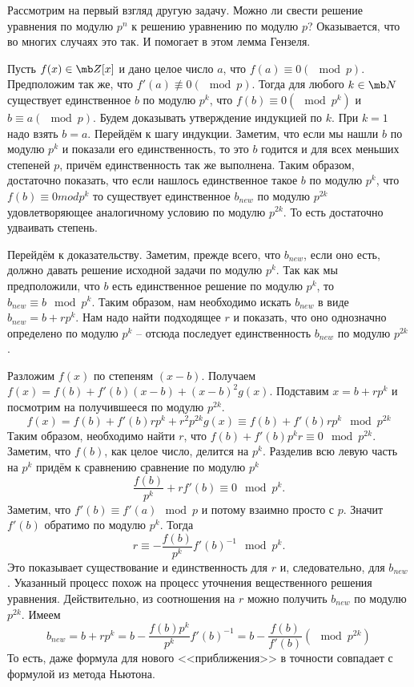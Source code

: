 Рассмотрим на первый взгляд другую задачу. Можно ли свести решение уравнения по модулю $p^n$ к решению уравнению по модулю $p$? Оказывается, что во многих случаях это так. И помогает в этом лемма Гензеля.

\lm Пусть $f(x)\in \mb Z[x]$ и дано целое число $a$, что $f(a)\equiv 0 (\mod p)$. Предположим так же, что $f'(a)\nequiv 0 ( \mod p)$. Тогда  для любого $k\in \mb N$ существует единственное $b$ по модулю $p^k$, что $f(b)\equiv 0(\mod p^k)$ и $b\equiv a (\mod p)$.   
\elm
\proof Будем доказывать утверждение индукцией по $k$. При $k=1$ надо взять $b=a$. Перейдём к шагу индукции. Заметим, что если мы нашли $b$ по модулю $p^k$ и показали его единственность, то это $b$ годится и для всех меньших степеней $p$, причём единственность так же выполнена. Таким образом, достаточно показать, что если нашлось единственное такое $b$ по модулю $p^k$, что $f(b)\equiv 0 mod p^k$  то существует единственное $b_{new}$ по модулю $p^{2k}$ удовлетворяющее аналогичному условию по модулю $p^{2k}$. То есть достаточно удваивать степень.

Перейдём к доказательству. Заметим, прежде всего, что $b_{new}$, если оно есть, должно давать решение исходной задачи по модулю $p^k$. Так как мы предположили, что $b$ есть единственное решение по модулю $p^k$, то $b_{new}\equiv b \mod p^k$. Таким образом, нам необходимо искать $b_{new}$ в виде $b_{new}=b+rp^k$. Нам надо найти подходящее $r$ и показать, что оно однозначно определено по модулю $p^k$ -- отсюда последует единственность $b_{new}$ по модулю $p^{2k}$.

Разложим $f(x)$ по степеням $(x-b)$. Получаем $f(x)=f(b)+f'(b)(x-b)+(x-b)^2g(x)$. Подставим $x=b+rp^k$ и посмотрим на получившееся по модулю $p^{2k}$. 
$$f(x)=f(b)+f'(b)rp^k+r^2p^{2k}g(x)\equiv f(b)+f'(b)rp^k \mod p^{2k}$$
Таким образом, необходимо найти $r$, что $f(b)+f'(b)p^kr\equiv 0 \mod p^{2k}$. Заметим, что $f(b)$, как целое число, делится на $p^k$. Разделив всю левую часть на $p^k$ придём к сравнению сравнение по модулю $p^k$
$$\frac{f(b)}{p^k}+rf'(b)\equiv 0\mod p^k.$$
Заметим, что $f'(b)\equiv f'(a) \mod p$ и потому взаимно просто с $p$. Значит $f'(b)$ обратимо по модулю $p^k$. Тогда 
$$r\equiv -\frac{f(b)}{p^k}f'(b)^{-1}\mod p^k.$$
Это показывает существование и единственность для $r$ и, следовательно, для $b_{new}$.  
\endproof
Указанный процесс похож на процесс уточнения вещественного решения уравнения. Действительно, из  соотношения на $r$ можно получить $b_{new}$ по модулю $p^{2k}$. Имеем $$b_{new}=b+rp^k=b-\frac{f(b)p^k}{p^k}f'(b)^{-1}=b-\frac{f(b)}{f'(b)} (\mod p^{2k})$$
То есть, даже формула для нового <<приближения>> в точности совпадает с формулой из метода Ньютона.

